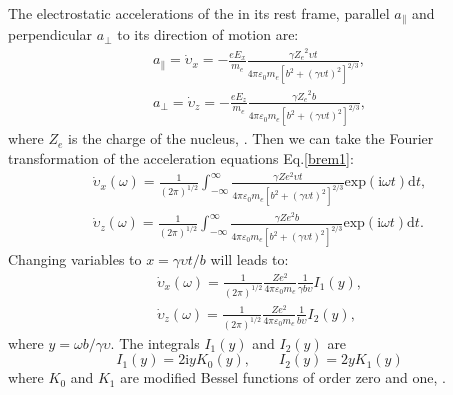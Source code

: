 \documentclass[oneside,a4paper,11pt]{report}
\begin{document}
The electrostatic accelerations of the in its rest frame, parallel $a_{\parallel}$ and perpendicular 
$a_\perp$ to its direction of motion are:        
\begin{equation}
\label{brem1}
\begin{split}
a_{\parallel} = \dot{\upsilon}_x = -\frac{eE_x}{m_e}\frac{\gamma {Z_e}^2 \upsilon t}{4\pi \varepsilon_0 m_e \left [ b^2 + \left ( \gamma \upsilon t \right )^2  \right ]^{2/3}} , \\ 
a_\perp  = \dot{\upsilon}_z = -\frac{eE_z}{m_e}\frac{\gamma {Z_e}^2 b}{4\pi \varepsilon_0 m_e \left [ b^2 + \left ( \gamma \upsilon t \right )^2  \right ]^{2/3}} ,
\end{split}
\end{equation}
where $Z_e$ is the charge of the nucleus, \citet{longair:1}. 
Then we can take the Fourier transformation of the acceleration equations Eq.\eqref{brem1}:
\begin{equation}
 \label{brem2}
\begin{split}
\dot{\upsilon}_x(\omega) = \frac{1}{(2\pi)^{1/2}}\int_{-\infty }^{\infty} \frac{\gamma Ze^2 \upsilon t}{4\pi \varepsilon_0 m_e \left [ b^2 + \left ( \gamma \upsilon t \right )^2 \right ]^{2/3} } \mathrm{exp}\left ( \mathrm{i} \omega t \right )\mathrm{d} t, \\
\dot{\upsilon}_z(\omega) = \frac{1}{(2\pi)^{1/2}}\int_{-\infty }^{\infty} \frac{\gamma Ze^2b}{4\pi \varepsilon_0 m_e \left [ b^2 + \left ( \gamma \upsilon t \right )^2 \right ]^{2/3} } \mathrm{exp}\left ( \mathrm{i} \omega t \right )\mathrm{d} t.
\end{split}
\end{equation}
Changing variables to $x = \gamma \upsilon t / b$ will leads to:
\begin{equation}
 \label{brem3}
\begin{split}
\dot{\upsilon}_x(\omega) = \frac{1}{(2\pi)^{1/2}} \frac{Ze^2}{4 \pi \varepsilon_0 m_e} \frac{1}{\gamma b \upsilon} I_1(y), \\
\dot{\upsilon}_z(\omega) = \frac{1}{(2\pi)^{1/2}} \frac{Ze^2}{4 \pi \varepsilon_0 m_e} \frac{1}{b \upsilon} I_2(y),
\end{split}
\end{equation}
where $y = \omega b / \gamma \upsilon$. The integrals $I_1(y)$ and $I_2(y)$ are
\begin{equation}
 \label{bremr_int}
I_1(y) = 2 \mathrm{i} y K_0 (y), \qquad I_2(y) = 2y K_1 (y)
\end{equation}
where $K_0$ and $K_1$ are modified Bessel functions of order zero and one, \citet{longair:1}.
\end{document}
